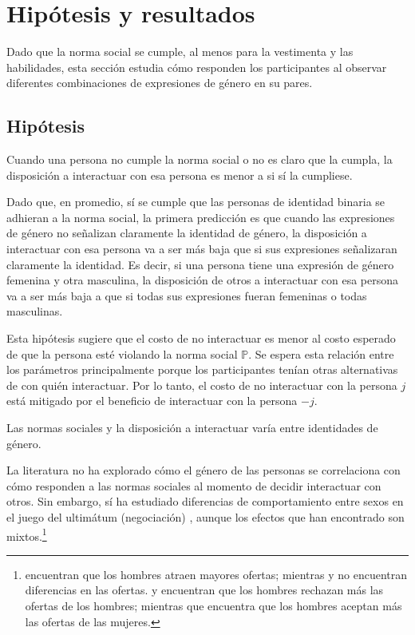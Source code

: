 \section{Hipótesis y resultados}
Dado que la norma social se cumple, al menos para la vestimenta y las habilidades, esta sección estudia cómo responden los participantes al observar diferentes combinaciones de expresiones de género en su pares.

\subsection{Hipótesis}
\begin{hyp}
Cuando una persona no cumple la norma social o no es claro que la cumpla, la disposición a interactuar con esa persona es menor a si sí la cumpliese. 
\end{hyp}

Dado que, en promedio, sí se cumple que las personas de identidad binaria se adhieran a la norma social, la primera predicción es que cuando las expresiones de género no señalizan claramente la identidad de género, la disposición a interactuar con esa persona va a ser más baja que si sus expresiones señalizaran claramente la identidad. Es decir, si una persona tiene una expresión de género femenina y otra masculina, la disposición de otros a interactuar con esa persona va a ser más baja a que si todas sus expresiones fueran femeninas o todas masculinas. 

Esta hipótesis sugiere que el costo de no interactuar es menor al costo esperado de que la persona esté violando la norma social $\mathbb{P}$. Se espera esta relación entre los parámetros principalmente porque los participantes tenían otras alternativas de con quién interactuar. Por lo tanto, el costo de no interactuar con la persona $j$ está mitigado por el beneficio de interactuar con la persona $-j$.

\begin{hyp}
Las normas sociales y la disposición a interactuar varía entre identidades de género.
\end{hyp}

La literatura no ha explorado cómo el género de las personas se correlaciona con cómo responden a las normas sociales al momento de decidir interactuar con otros. Sin embargo, sí ha estudiado diferencias de comportamiento entre sexos en el juego del ultimátum (negociación) \citep{solnick2001genderultimatumgame, eckel2001chivalryultimatumgame, gomez2018gendernegociacion}, aunque los efectos que han encontrado son mixtos.\footnote{\cite{solnick2001genderultimatumgame} encuentran que los hombres atraen mayores ofertas; mientras \cite{eckel2001chivalryultimatumgame} y \cite{gomez2018gendernegociacion} no encuentran diferencias en las ofertas. \cite{solnick2001genderultimatumgame} y \cite{gomez2018gendernegociacion} encuentran que los hombres rechazan más las ofertas de los hombres; mientras que \cite{eckel2001chivalryultimatumgame} encuentra que los hombres aceptan más las ofertas de las mujeres.} 

